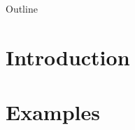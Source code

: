 \documentclass{presets}
\begin{document}
	
\begin{frame}
	\titlepage
\end{frame}

\begin{frame}{Outline}
\tableofcontents
\end{frame}

\section{Introduction}





\section{Examples}



\end{document}
